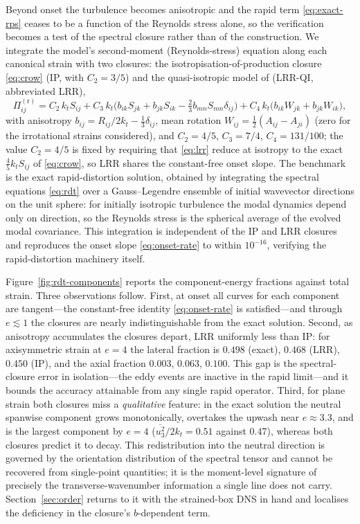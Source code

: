 \documentclass[lineno]{JFM-FLM_Au}
\begin{document}
Beyond onset the turbulence becomes anisotropic and the rapid term
\eqref{eq:exact-rps} ceases to be a function of the Reynolds stress
alone, so the verification becomes a test of the spectral closure rather
than of the construction. We integrate the model's second-moment (Reynolds-stress) equation along
each canonical strain with two closures: the isotropisation-of-production
closure \eqref{eq:crow} (IP, with $C_2=3/5$) and the
quasi-isotropic model of \citet{LaunderReeceRodi1975} (LRR-QI, abbreviated
LRR),
\begin{equation}
  \Pi^{(\mathrm r)}_{ij} = C_2\,k_t S_{ij}
  + C_3\,k_t\big(b_{ik}S_{jk}+b_{jk}S_{ik}
  -\tfrac{2}{3}b_{mn}S_{mn}\delta_{ij}\big)
  + C_4\,k_t\big(b_{ik}W_{jk}+b_{jk}W_{ik}\big),
  \label{eq:lrr}
\end{equation}
with anisotropy $b_{ij}=R_{ij}/2k_t-\tfrac13\delta_{ij}$, mean rotation
$W_{ij}=\tfrac12(A_{ij}-A_{ji})$ (zero for the irrotational strains
considered), and $C_2=4/5$, $C_3=7/4$, $C_4=131/100$; the value
$C_2=4/5$ is fixed by requiring that \eqref{eq:lrr} reduce at isotropy to
the exact $\tfrac45k_tS_{ij}$ of \eqref{eq:crow}, so LRR shares the
constant-free onset slope. The benchmark is the exact rapid-distortion
solution, obtained by integrating the spectral equations \eqref{eq:rdt}
over a Gauss--Legendre ensemble of initial wavevector directions on the
unit sphere: for initially isotropic turbulence the modal dynamics depend
only on direction, so the Reynolds stress is the spherical average of the
evolved modal covariance. This integration is independent of the IP and
LRR closures and reproduces the onset slope \eqref{eq:onset-rate} to within
$10^{-16}$, verifying the rapid-distortion machinery itself.

Figure~\ref{fig:rdt-components} reports the component-energy fractions
against total strain. Three observations follow. First, at onset all
curves for each component are tangent---the constant-free identity
\eqref{eq:onset-rate} is satisfied---and through $e\lesssim1$ the
closures are nearly indistinguishable from the exact solution. Second,
as anisotropy accumulates the closures depart, LRR uniformly less than
IP: for axisymmetric strain at $e=4$ the lateral fraction is $0.498$
(exact), $0.468$ (LRR), $0.450$ (IP), and the axial fraction $0.003$,
$0.063$, $0.100$. This gap is the spectral-closure error in
isolation---the eddy events are inactive in the rapid limit---and it
bounds the accuracy attainable from any single rapid operator. Third, for plane strain both closures miss
a \emph{qualitative} feature: in the exact solution the neutral spanwise
component grows monotonically, overtakes the upwash near $e\approx3.3$,
and is the largest component by $e=4$
($\overline{u_3^2}/2k_t=0.51$ against $0.47$), whereas both closures
predict it to decay. This redistribution into the neutral direction is
governed by the orientation distribution of the spectral tensor and
cannot be recovered from single-point quantities; it is the moment-level
signature of precisely the transverse-wavenumber information a single
line does not carry. Section~\ref{sec:order} returns to it with the
strained-box DNS in hand and localises the deficiency in the closure's
$b$-dependent term.
\end{document}
